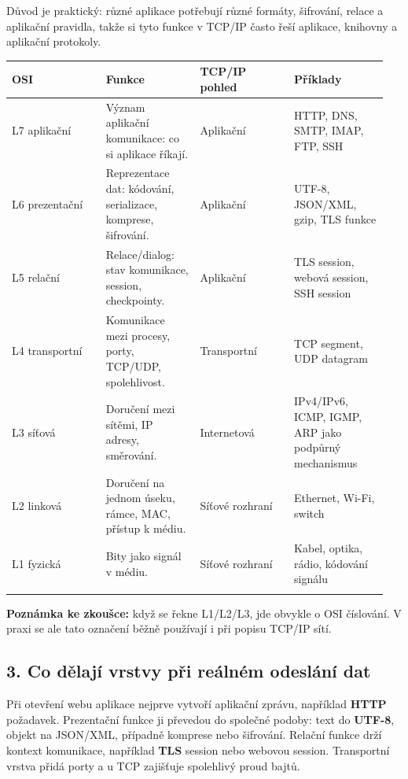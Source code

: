 \documentclass[11pt,a4paper]{article}
\newcommand{\itzk}[1]{\medskip\noindent\colorbox{blue!7}{\parbox{\dimexpr\linewidth-2\fboxsep}{#1}}\medskip}
\begin{document}
Důvod je praktický: různé aplikace potřebují různé formáty, šifrování, relace a aplikační pravidla, takže si tyto funkce v TCP/IP často řeší aplikace, knihovny a aplikační protokoly.

\begin{longtable}{p{0.237\linewidth}p{0.237\linewidth}p{0.237\linewidth}p{0.237\linewidth}}
\toprule
\textbf{OSI} & \textbf{Funkce} & \textbf{TCP/IP pohled} & \textbf{Příklady} \\
\midrule\endhead
L7 aplikační & Význam aplikační komunikace: co si aplikace říkají. & Aplikační & HTTP, DNS, SMTP, IMAP, FTP, SSH \\
\addlinespace
L6 prezentační & Reprezentace dat: kódování, serializace, komprese, šifrování. & Aplikační & UTF-8, JSON/XML, gzip, TLS funkce \\
\addlinespace
L5 relační & Relace/dialog: stav komunikace, session, checkpointy. & Aplikační & TLS session, webová session, SSH session \\
\addlinespace
L4 transportní & Komunikace mezi procesy, porty, TCP/UDP, spolehlivost. & Transportní & TCP segment, UDP datagram \\
\addlinespace
L3 síťová & Doručení mezi sítěmi, IP adresy, směrování. & Internetová & IPv4/IPv6, ICMP, IGMP, ARP jako podpůrný mechanismus \\
\addlinespace
L2 linková & Doručení na jednom úseku, rámce, MAC, přístup k médiu. & Síťové rozhraní & Ethernet, Wi-Fi, switch \\
\addlinespace
L1 fyzická & Bity jako signál v médiu. & Síťové rozhraní & Kabel, optika, rádio, kódování signálu \\
\addlinespace
\bottomrule
\end{longtable}

\itzk{\textbf{Poznámka ke zkoušce:} když se řekne L1/L2/L3, jde obvykle o OSI číslování. V praxi se ale tato označení běžně používají i při popisu TCP/IP sítí.}

\subsection*{3. Co dělají vrstvy při reálném odeslání dat}

Při otevření webu aplikace nejprve vytvoří aplikační zprávu, například \textbf{HTTP} požadavek. Prezentační funkce ji převedou do společné podoby: text do \textbf{UTF-8}, objekt na JSON/XML, případně komprese nebo šifrování. Relační funkce drží kontext komunikace, například \textbf{TLS} session nebo webovou session. Transportní vrstva přidá porty a u TCP zajišťuje spolehlivý proud bajtů.
\end{document}
